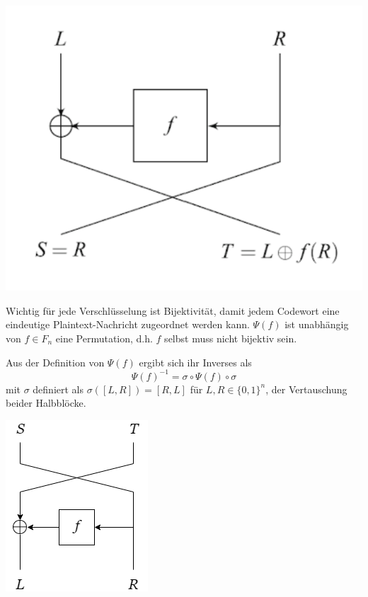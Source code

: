 \documentclass[course=erap]{aspdoc}
\begin{document}
\begin{center}
    \includegraphics[scale=1]{img/1_round_feistel_cipher_enc.png}\break
    \cite[Fig. 2.1]{nachef}
\end{center}

Wichtig für jede Verschlüsselung ist Bijektivität, damit jedem Codewort eine eindeutige Plaintext-Nachricht zugeordnet werden kann. $\Psi(f)$ ist unabhängig von $f \in F_n$ eine Permutation, d.h. $f$ selbst muss nicht bijektiv sein.\cite[p.12]{nachef}\bigbreak

Aus der Definition von $\Psi(f)$ ergibt sich ihr Inverses als
\[
    \Psi(f)^{-1} = \sigma \circ \Psi(f) \circ \sigma
\]
mit $\sigma$ definiert als $\sigma([L, R]) = [R, L]$ für $L, R \in \{0, 1\}^n$, der Vertauschung beider Halbblöcke.\cite[p.12]{nachef}

\begin{center}
    \includegraphics[scale=0.5]{img/1_round_feistel_cipher_dec.png}
\end{center}
\end{document}
